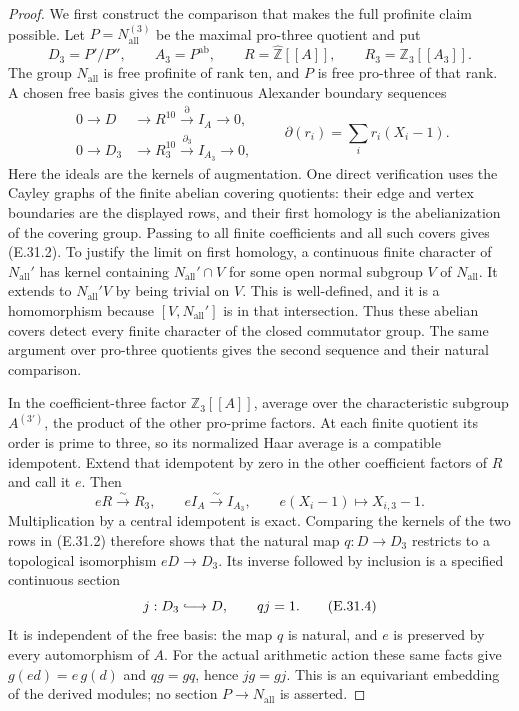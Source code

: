 \documentclass[11pt,oneside]{article}
\begin{document}
\begin{proof}
We first construct the comparison that makes the full profinite
claim possible. Let $P=N_{\mathrm{all}}^{(3)}$ be the maximal
pro-three quotient and put
\[
 D_3=P'/P'',\qquad A_3=P^{\mathrm{ab}},\qquad
 R=\widehat{\mathbb Z}[[A]],\qquad R_3=\mathbb Z_3[[A_3]].
\]
The group $N_{\mathrm{all}}$ is free profinite of rank ten,
and $P$ is free pro-three of that rank. A chosen free basis
gives the continuous Alexander boundary sequences
\[
 \begin{aligned}
 0\longrightarrow D&\longrightarrow R^{10}
       \xrightarrow{\partial} I_A\longrightarrow0,\\
 0\longrightarrow D_3&\longrightarrow R_3^{10}
       \xrightarrow{\partial_3} I_{A_3}\longrightarrow0,
 \end{aligned}
 \qquad
 \partial(r_i)=\sum_i r_i(X_i-1).
 \tag{E.31.2}
\]
Here the ideals are the kernels of augmentation. One direct
verification uses the Cayley graphs of the finite abelian
covering quotients: their edge and vertex boundaries are the
displayed rows, and their first homology is the abelianization
of the covering group. Passing to all finite coefficients and
all such covers gives (E.31.2). To justify the limit on first
homology, a continuous finite character of $N_{\mathrm{all}}'$
has kernel containing $N_{\mathrm{all}}'\cap V$ for some open
normal subgroup $V$ of $N_{\mathrm{all}}$. It extends to
$N_{\mathrm{all}}'V$ by being trivial on $V$. This is
well-defined, and it is a homomorphism because
$[V,N_{\mathrm{all}}']$ is in that intersection. Thus these
abelian covers detect every finite character of the closed
commutator group. The same argument over pro-three quotients
gives the second sequence and their natural comparison.

In the coefficient-three factor $\mathbb Z_3[[A]]$, average
over the characteristic subgroup $A^{(3')}$, the product of
the other pro-prime factors. At each finite quotient its
order is prime to three, so its normalized Haar average
is a compatible idempotent. Extend that idempotent by zero
in the other coefficient factors of $R$ and call it $e$.
Then
\[
 eR\xrightarrow{\sim}R_3,
 \qquad eI_A\xrightarrow{\sim}I_{A_3},
 \qquad e(X_i-1)\longmapsto X_{i,3}-1.
 \tag{E.31.3}
\]
Multiplication by a central idempotent is exact.
Comparing the kernels of the two rows in (E.31.2)
therefore shows that the natural map $q:D\to D_3$
restricts to a topological isomorphism $eD\to D_3$.
Its inverse followed by inclusion is a specified continuous
section
\[
 j:D_3\lhook\joinrel\longrightarrow D,
                  \qquad qj=1.
 \tag{E.31.4}
\]
It is independent of the free basis: the map $q$ is natural,
and $e$ is preserved by every automorphism of $A$.
For the actual arithmetic action these same facts give
$g(e d)=e\,g(d)$ and $qg=gq$, hence $jg=gj$.
This is an equivariant embedding of the derived modules;
no section $P\to N_{\mathrm{all}}$ is asserted.


\end{proof}
\end{document}

